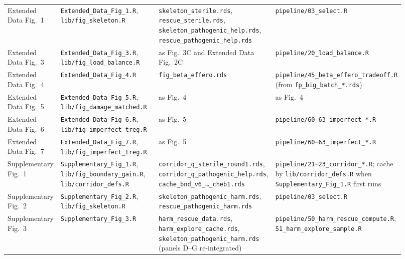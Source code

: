\documentclass[11pt]{article}
\begin{document}
\begin{longtable}{@{}p{0.13\linewidth}p{0.29\linewidth}p{0.26\linewidth}p{0.24\linewidth}@{}}
Extended Data Fig.~1 & \texttt{Extended\_Data\_Fig\_1.R}, \texttt{lib/fig\_skeleton.R} & \texttt{skeleton\_sterile.rds}, \texttt{rescue\_sterile.rds}, \texttt{skeleton\_pathogenic\_help.rds}, \texttt{rescue\_pathogenic\_help.rds} & \texttt{pipeline/03\_select.R}\\
Extended Data Fig.~3 & \texttt{Extended\_Data\_Fig\_3.R}, \texttt{lib/fig\_load\_balance.R} & as Fig.~3C and Extended Data Fig.~2C & \texttt{pipeline/20\_load\_balance.R}\\
Extended Data Fig.~4 & \texttt{Extended\_Data\_Fig\_4.R} & \texttt{fig\_beta\_effero.rds} & \texttt{pipeline/45\_beta\_effero\_tradeoff.R} (from \texttt{fp\_big\_batch\_*.rds})\\
Extended Data Fig.~5 & \texttt{Extended\_Data\_Fig\_5.R}, \texttt{lib/fig\_damage\_matched.R} & as Fig.~4 & as Fig.~4\\
Extended Data Fig.~6 & \texttt{Extended\_Data\_Fig\_6.R}, \texttt{lib/fig\_imperfect\_treg.R} & as Fig.~5 & \texttt{pipeline/60}--\texttt{63\_imperfect\_*.R}\\
Extended Data Fig.~7 & \texttt{Extended\_Data\_Fig\_7.R}, \texttt{lib/fig\_imperfect\_treg.R} & as Fig.~5 & \texttt{pipeline/60}--\texttt{63\_imperfect\_*.R}\\
Supplementary Fig.~1 & \texttt{Supplementary\_Fig\_1.R}, \texttt{lib/fig\_boundary\_gain.R}, \texttt{lib/corridor\_defs.R} & \texttt{corridor\_q\_sterile\_round1.rds}, \texttt{corridor\_q\_pathogenic\_help.rds}, \texttt{cache\_bnd\_v6\_\ldots\_cheb1.rds} & \texttt{pipeline/21}--\texttt{23\_corridor\_*.R}; cache by \texttt{lib/corridor\_defs.R} when \texttt{Supplementary\_Fig\_1.R} first runs\\
Supplementary Fig.~2 & \texttt{Supplementary\_Fig\_2.R}, \texttt{lib/fig\_skeleton.R} & \texttt{skeleton\_pathogenic\_harm.rds}, \texttt{rescue\_pathogenic\_harm.rds} & \texttt{pipeline/03\_select.R}\\
Supplementary Fig.~3 & \texttt{Supplementary\_Fig\_3.R} & \texttt{harm\_rescue\_data.rds}, \texttt{harm\_explore\_cache.rds}, \texttt{skeleton\_pathogenic\_harm.rds} (panels D--G re-integrated) & \texttt{pipeline/50\_harm\_rescue\_compute.R}, \texttt{51\_harm\_explore\_sample.R}\\
\end{longtable}
\end{document}
